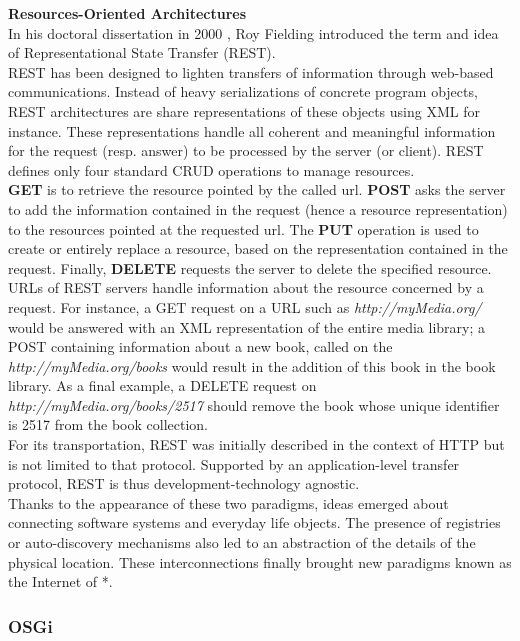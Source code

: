 {\bf Resources-Oriented Architectures}\\

In his doctoral dissertation in 2000 \cite{Fielding:2000}, Roy Fielding introduced the term and idea of Representational State Transfer (REST).\\
REST has been designed to lighten transfers of information through web-based communications. Instead of heavy serializations of concrete program objects, REST architectures are share representations of these objects using XML for instance. These representations handle all coherent and meaningful information for the request (resp. answer) to be processed by the server (or client). REST defines only four standard CRUD \cite{Yoder:1998} operations to manage resources.\\
{\bf GET} is to retrieve the resource pointed by the called url. {\bf POST} asks the server to add the information contained in the request (hence a resource representation) to the resources pointed at the requested url. The {\bf PUT} operation is used to create or entirely replace a resource, based on the representation contained in the request. Finally, {\bf DELETE} requests the server to delete the specified resource.\\
URLs of REST servers handle information about the resource concerned by a request. For instance, a GET request on a URL such as {\it http://myMedia.org/} would be answered with an XML representation of the entire media library; a POST containing information about a new book, called on the {\it http://myMedia.org/books} would result in the addition of this book in the book library. As a final example, a DELETE request on {\it http://myMedia.org/books/2517} should remove the book whose unique identifier is 2517 from the book collection.\\
For its transportation, REST was initially described in the context of HTTP but is not limited to that protocol. Supported by an application-level transfer protocol, REST is thus development-technology agnostic.\\


Thanks to the appearance of these two paradigms, ideas emerged about connecting software systems and everyday life objects. The presence of registries or auto-discovery mechanisms also led to an abstraction of the details of the physical location. These interconnections finally brought new paradigms known as the Internet of *. 


\subsubsection{OSGi}
\label{subsec:osgi}


